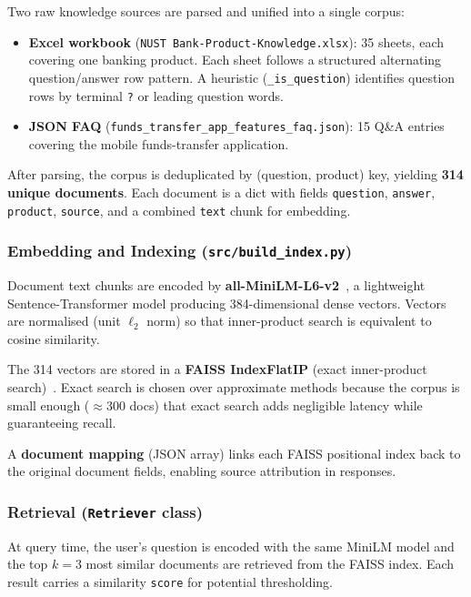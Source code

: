 \documentclass[12pt,a4paper]{article}
\begin{document}
Two raw knowledge sources are parsed and unified into a single corpus:

\begin{itemize}
  \item \textbf{Excel workbook} (\texttt{NUST Bank-Product-Knowledge.xlsx}):
        35 sheets, each covering one banking product.  Each sheet follows a
        structured alternating question/answer row pattern.  A heuristic
        (\texttt{\_is\_question}) identifies question rows by terminal
        \texttt{?} or leading question words.
  \item \textbf{JSON FAQ} (\texttt{funds\_transfer\_app\_features\_faq.json}):
        15 Q\&A entries covering the mobile funds-transfer application.
\end{itemize}

After parsing, the corpus is deduplicated by (question, product) key, yielding
\textbf{314 unique documents}.  Each document is a dict with fields
\texttt{question}, \texttt{answer}, \texttt{product}, \texttt{source}, and a
combined \texttt{text} chunk for embedding.

\subsubsection{Embedding and Indexing (\texttt{src/build\_index.py})}

Document text chunks are encoded by
\textbf{all-MiniLM-L6-v2}~\cite{reimers2019sentencebert}, a lightweight
Sentence-Transformer model producing 384-dimensional dense vectors.  Vectors are
normalised (unit $\ell_2$ norm) so that inner-product search is equivalent to
cosine similarity.

The 314 vectors are stored in a \textbf{FAISS IndexFlatIP} (exact inner-product
search)~\cite{johnson2019faiss}.  Exact search is chosen over approximate methods
because the corpus is small enough ($\approx$300 docs) that exact search adds
negligible latency while guaranteeing recall.

A \textbf{document mapping} (JSON array) links each FAISS positional index back
to the original document fields, enabling source attribution in responses.

\subsubsection{Retrieval (\texttt{Retriever} class)}

At query time, the user's question is encoded with the same MiniLM model and the
top $k=3$ most similar documents are retrieved from the FAISS index.  Each result
carries a similarity \texttt{score} for potential thresholding.
\end{document}
